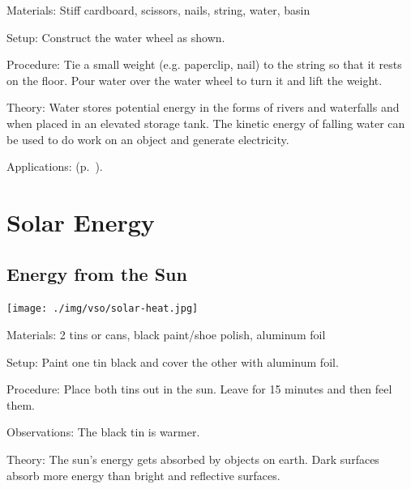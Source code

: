 \begin{multicols}{2}
\begin{description*}
\item[Materials:]{Stiff cardboard, scissors, nails, string, water, basin}
\item[Setup:]{Construct the water wheel as shown.}
\item[Procedure:]{Tie a small weight (e.g. paperclip, nail) to the string so that it rests on the floor. Pour water over the water wheel to turn it and lift the weight. }
\item[Theory:]{Water stores potential energy in the forms of rivers and waterfalls and when placed in an elevated storage tank. The kinetic energy of falling water can be used to do work on an object and generate electricity.}
\item[Applications:]{ (p.~\pageref{sub:water-turbine}).}
\end{description*}

\columnbreak


\section*{Solar Energy}


\subsection{Energy from the Sun}

\begin{center}
\texttt{[image: ./img/vso/solar-heat.jpg]}
\end{center}

\begin{description*}
\item[Materials:]{2 tins or cans, black paint/shoe polish, aluminum foil}
\item[Setup:]{Paint one tin black and cover the other with aluminum foil.}
\item[Procedure:]{Place both tins out in the sun. Leave for 15 minutes and then feel them.}
\item[Observations:]{The black tin is warmer.}
\item[Theory:]{The sun's energy gets absorbed by objects on earth. Dark surfaces absorb more energy than bright and reflective surfaces.}
\end{description*}


\end{multicols}
